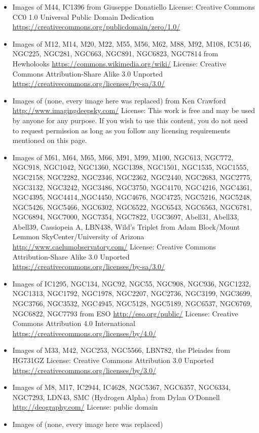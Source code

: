 \begin{itemize}
from NASA
	 License: public domain
\item Images of M44, IC1396 
	from Giuseppe Donatiello
	 License: Creative Commons CC0 1.0 Universal Public Domain Dedication \url{https://creativecommons.org/publicdomain/zero/1.0/}
\item Images of M12, M14, M20, M22, M55, M56, M62, M88, M92, M108, 
	 IC5146, NGC225, NGC281, NGC663, NGC891, NGC6823, NGC7814
	 from Hewholooks
	 \url{https://commons.wikimedia.org/wiki/}
	 License: Creative Commons Attribution-Share Alike 3.0 Unported \url{https://creativecommons.org/licenses/by-sa/3.0/}
\item Images of (none, every image here was replaced) from Ken Crawford
	 \url{http://www.imagingdeepsky.com/}
	 License: This work is free and may be used by anyone for any purpose.
	 If you wish to use this content, you do not need to request permission
	 as long as you follow any licensing requirements mentioned on this page.
\item Images of M61, M64, M65, M66, M91, M99, M100, NGC613, NGC772, NGC918, NGC1042, NGC1360, NGC1398,
	 NGC1501, NGC1535, NGC1555, NGC2158, NGC2282, NGC2346, NGC2362, NGC2440, NGC2683, NGC2775, NGC3132,
	 NGC3242, NGC3486, NGC3750, NGC4170, NGC4216, NGC4361, NGC4395, NGC4414,,NGC4450, NGC4676, NGC4725,
	 NGC5216, NGC5248, NGC5426, NGC5466, NGC6302, NGC6522, NGC6543, NGC6563, NGC6781, NGC6894, NGC7000,
	 NGC7354, NGC7822, UGC3697, Abell31, Abell33, Abell39, Cassiopeia A, LBN438, Wild's Triplet
	 from Adam Block/Mount Lemmon SkyCenter/University of Arizona
	 \url{http://www.caelumobservatory.com/}
	 License: Creative Commons Attribution-Share Alike 3.0 Unported \url{https://creativecommons.org/licenses/by-sa/3.0/}
\item Images of IC1295, NGC134, NGC92, NGC55, NGC908, NGC936, NGC1232, NGC1313,
	 NGC1792, NGC1978, NGC2207, NGC2736, NGC3199, NGC3699, NGC3766, NGC3532, NGC4945, NGC5128, NGC5189,
	 NGC6537, NGC6769, NGC6822, NGC7793
	 from ESO
	 \url{http://eso.org/public/}
	 License: Creative Commons Attribution 4.0 International \url{https://creativecommons.org/licenses/by/4.0/}
\item Images of M33, M42, NGC253, NGC5566, LBN782, the Pleiades 
	from HG731GZ
	 License: Creative Commons Attribution 3.0 Unported \url{https://creativecommons.org/licenses/by/3.0/}
\item Images of M8, M17, IC2944, IC4628, NGC5367, NGC6357,
	 NGC6334, NGC7293, LDN43, SMC (Hydrogen Alpha)
	 from Dylan O'Donnell
	 \url{http://deography.com/}
	 License: public domain
\item Images of (none, every image here was replaced)

\end{itemize}
